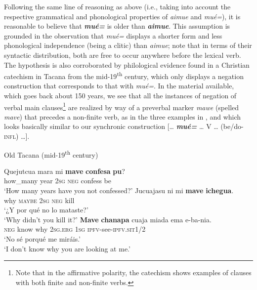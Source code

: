 \documentclass[output=paper]{langsci/langscibook}
\begin{document}
Following the same line of reasoning as above (i.e., taking into account
the respective grammatical and phonological properties of \textit{aimue}
and \textit{mué=}), it is reasonable to believe that \textbf{\textit{mué=}}
is older than \textbf{\textit{aimue}}. This assumption is grounded in the
observation that \textit{mué=} displays a shorter form and less
phonological independence (being a clitic) than \textit{aimue}; note that
in terms of their syntactic distribution, both are free to occur anywhere
before the lexical verb. The hypothesis is also corroborated by
philological evidence found in a Christian catechism in Tacana from
the mid-19\textsuperscript{th} century, which only displays a negation construction that
corresponds to that with \textit{mué=}. In the material available, which
goes back about 150 years, we see that all the instances of negation
of verbal main clauses\footnote{\label{fn:tacana-catechism} Note that in the affirmative polarity, the catechism shows
    examples of clauses with both finite and non-finite verbs.} 
%
are realized by way of a preverbal marker \textit{mawe} (spelled
\textit{mave}) that precedes a non-finite verb, as in the three examples in
, and which looks basically similar to our synchronic construction [… \textbf{\textit{mué=}} … V … (be/do-\textsc{infl}) …].

\begin{exe}\ex\label{ex:tacana-old-catecism} Old Tacana
(mid-19\textsuperscript{th} century)
\begin{xlist}
\ex
\gll Quejutcua mara mi \textbf{mave}
\textbf{confesa} \textbf{pu}?\\
    how\_many year \textsc{2sg} \textsc{neg} confess be\\
\glt `How many years have you not confessed?' \parencite[297]{LafoneQuevedo1902}
\ex
\gll Jucuajasu ni mi \textbf{mave}
\textbf{ichegua}.\\
    why  \textsc{maybe}  \textsc{2sg}  \textsc{neg}  kill\\
\glt `¿Y por qué no lo mataste?' \parencite[310]{LafoneQuevedo1902}\\
`Why didn't you kill it?'
\ex
\gll {}\textbf{Mave} \textbf{chanapa} cuaja
 miada ema e-ba-nia.\\
    \textsc{neg}  know  why  \textsc{2sg.erg}  \textsc{1sg}
    \textsc{ipfv}-see-\textsc{ipfv.sit1/2}\\
\glt `No sé porqué me miráis.' \parencite[310]{LafoneQuevedo1902}\\
`I don't know why you are looking at me.'
\end{xlist}\end{exe}
\end{document}
